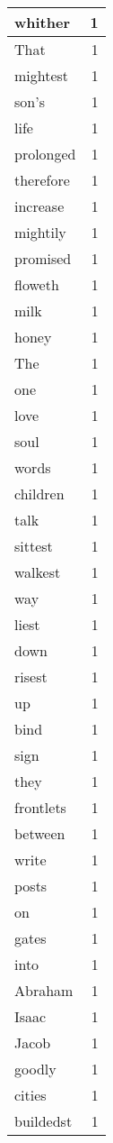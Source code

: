 \begin{center}
\begin{longtable}{l|r}
whither & 1 \\ \hline
That & 1 \\ \hline
mightest & 1 \\ \hline
son's & 1 \\ \hline
life & 1 \\ \hline
prolonged & 1 \\ \hline
therefore & 1 \\ \hline
increase & 1 \\ \hline
mightily & 1 \\ \hline
promised & 1 \\ \hline
floweth & 1 \\ \hline
milk & 1 \\ \hline
honey & 1 \\ \hline
The & 1 \\ \hline
one & 1 \\ \hline
love & 1 \\ \hline
soul & 1 \\ \hline
words & 1 \\ \hline
children & 1 \\ \hline
talk & 1 \\ \hline
sittest & 1 \\ \hline
walkest & 1 \\ \hline
way & 1 \\ \hline
liest & 1 \\ \hline
down & 1 \\ \hline
risest & 1 \\ \hline
up & 1 \\ \hline
bind & 1 \\ \hline
sign & 1 \\ \hline
they & 1 \\ \hline
frontlets & 1 \\ \hline
between & 1 \\ \hline
write & 1 \\ \hline
posts & 1 \\ \hline
on & 1 \\ \hline
gates & 1 \\ \hline
into & 1 \\ \hline
Abraham & 1 \\ \hline
Isaac & 1 \\ \hline
Jacob & 1 \\ \hline
goodly & 1 \\ \hline
cities & 1 \\ \hline
buildedst & 1 \\ \hline

\end{longtable}
\end{center}
